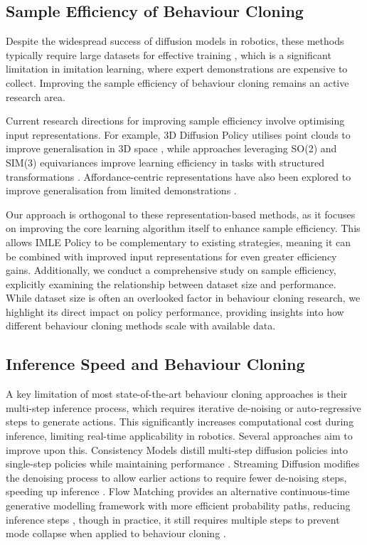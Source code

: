 \subsection{Sample Efficiency of Behaviour Cloning}
Despite the widespread success of diffusion models in robotics, these methods typically require large datasets for effective training \cite{zhao2024aloha}, which is a significant limitation in imitation learning, where expert demonstrations are expensive to collect. Improving the sample efficiency of behaviour cloning remains an active research area. 

Current research directions for improving sample efficiency involve optimising input representations. For example, 3D Diffusion Policy utilises point clouds to improve generalisation in 3D space \cite{ze20243d}, while approaches leveraging SO(2) and SIM(3) equivariances improve learning efficiency in tasks with structured transformations \cite{wangequivariant, yang2024equibot}. Affordance-centric representations have also been explored to improve generalisation from limited demonstrations \cite{rana2024affordance}. 

Our approach is orthogonal to these representation-based methods, as it focuses on improving the core learning algorithm itself to enhance sample efficiency. This allows IMLE Policy to be complementary to existing strategies, meaning it can be combined with improved input representations for even greater efficiency gains. Additionally, we conduct a comprehensive study on sample efficiency, explicitly examining the relationship between dataset size and performance. While dataset size is often an overlooked factor in behaviour cloning research, we highlight its direct impact on policy performance, providing insights into how different behaviour cloning methods scale with available data.

\subsection{Inference Speed and Behaviour Cloning}
A key limitation of most state-of-the-art behaviour cloning approaches is their multi-step inference process, which requires iterative de-noising or auto-regressive steps to generate actions. This significantly increases computational cost during inference, limiting real-time applicability in robotics. Several approaches aim to improve upon this. Consistency Models distill multi-step diffusion policies into single-step policies while maintaining performance \cite{prasad2024consistency, song2023consistency}. Streaming Diffusion modifies the denoising process to allow earlier actions to require fewer de-noising steps, speeding up inference \cite{høeg2024streamingdiffusionpolicyfast}. Flow Matching provides an alternative continuous-time generative modelling framework with more efficient probability paths, reducing inference steps \cite{lipmanflow, liuflow}, though in practice, it still requires multiple steps to prevent mode collapse when applied to behaviour cloning \cite{hu2024adaflow, black2024pi_0, zhang2024affordance}.

